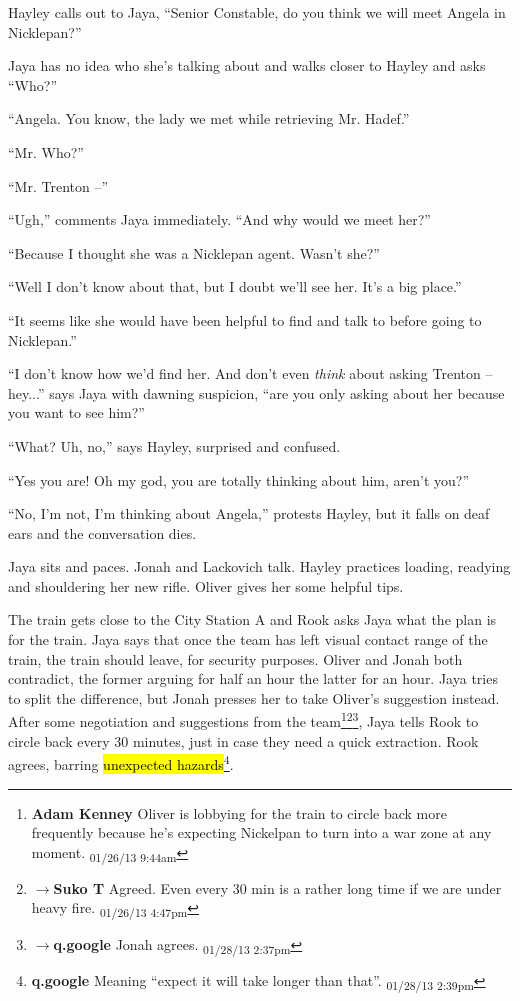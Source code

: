 Hayley calls out to Jaya, ``Senior Constable, do you think we will meet Angela in Nicklepan?''

Jaya has no idea who she's talking about and walks closer to Hayley and asks ``Who?''

``Angela.  You know, the lady we met while retrieving Mr. Hadef.''

``Mr. Who?''

``Mr. Trenton --''

``Ugh,'' comments Jaya immediately. ``And why would we meet her?''

``Because I thought she was a Nicklepan agent.  Wasn't she?''

``Well I don't know about that, but I doubt we'll see her.  It's a big place.''

``It seems like she would have been helpful to find and talk to before going to Nicklepan.''

``I don't know how we'd find her.  And don't even \textit{think} about asking Trenton -- hey...'' says Jaya with dawning suspicion, ``are you only asking about her because you want to see him?''

``What?  Uh, no,'' says Hayley, surprised and confused.

``Yes you are!  Oh my god, you are totally thinking about him, aren't you?''

``No, I'm not, I'm thinking about Angela,'' protests Hayley, but it falls on deaf ears and the conversation dies.



Jaya sits and paces.  Jonah and Lackovich talk.  Hayley practices loading, readying and shouldering her new rifle.  Oliver gives her some helpful tips.



The train gets close to the City Station A and Rook asks Jaya what the plan is for the train.  Jaya says that once the team has left visual contact range of the train, the train should leave, for security purposes.  Oliver and Jonah both contradict, the former arguing for half an hour the latter for an hour.  Jaya tries to split the difference, but Jonah presses her to take Oliver's suggestion instead.  After some negotiation and suggestions from the team\footnote{\textbf{Adam Kenney }Oliver is lobbying for the train to circle back more frequently because he's expecting Nickelpan to turn into a war zone at any moment. \textsubscript{01/26/13 9:44am}}\footnote{$\rightarrow$\textbf{Suko T }Agreed.  Even every 30 min is a rather long time if we are under heavy fire. \textsubscript{01/26/13 4:47pm}}\footnote{$\rightarrow$\textbf{q.google }Jonah agrees. \textsubscript{01/28/13 2:37pm}}, Jaya tells Rook to circle back every 30 minutes, just in case they need a quick extraction.  Rook agrees, barring \hl{unexpected hazards}\footnote{\textbf{q.google }Meaning ``expect it will take longer than that''. \textsubscript{01/28/13 2:39pm}}.



